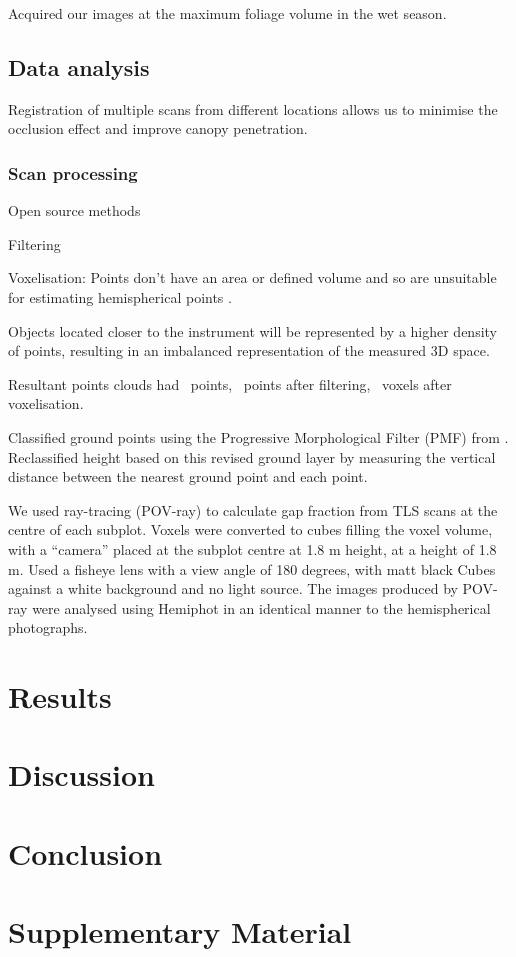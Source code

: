 \documentclass[11pt,a4paper]{article}
\newcommand{\beginsupplement}{%
	\setcounter{table}{0}
	\renewcommand{\thetable}{S\arabic{table}}%
	\setcounter{figure}{0}
	\renewcommand{\thefigure}{S\arabic{figure}}%
}
\begin{document}
Acquired our images at the maximum foliage volume in the wet season.

\subsection{Data analysis}

Registration of multiple scans from different locations allows us to minimise
the occlusion effect and improve canopy penetration.

\subsubsection{Scan processing}

Open source methods

Filtering

Voxelisation: Points don't have an area or defined volume and so are unsuitable
for estimating hemispherical points \citep{Seidel2012}.

Objects located closer to the instrument will be represented by a higher density
of points, resulting in an imbalanced representation of the measured 3D space.

Resultant points clouds had ~points, ~points after filtering, ~voxels after
voxelisation.

Classified ground points using the Progressive Morphological Filter (PMF) from
\citep{Zhang2003}. Reclassified height based on this revised ground layer by
measuring the vertical distance between the nearest ground point and each point.

We used ray-tracing (POV-ray) to calculate gap fraction from TLS scans at the
centre of each subplot. Voxels were converted to cubes filling the voxel volume,
with a ``camera'' placed at the subplot centre at 1.8 m height, at a height of
1.8 m. Used a fisheye lens with a view angle of 180 degrees, with matt black
Cubes against a white background and no light source. The images produced by
POV-ray were analysed using Hemiphot in an identical manner to the hemispherical
photographs.

\section{Results}

\section{Discussion}

\section{Conclusion}

\printbibliography

\section{Supplementary Material} \beginsupplement
\end{document}
